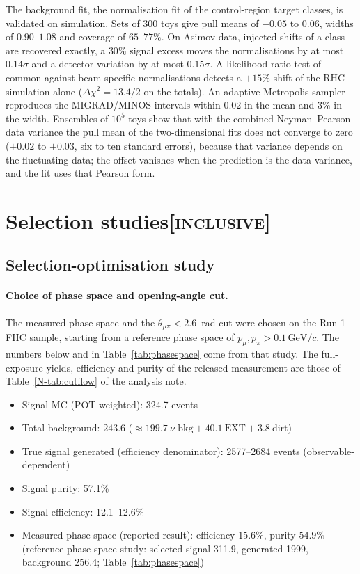 \documentclass[11pt,a4paper]{article}
\newcommand{\GeVc}{\,\text{GeV}\!/c}
\newcommand{\noteref}[2]{#1~\ref{N-#2} of the analysis note}
\newcommand{\scopetag}[1]{\hfill{\normalfont\small\textsc{[#1]}}}
\begin{document}
The background fit, the normalisation fit of the control-region target classes, is validated on
simulation. Sets of $300$ toys give pull means of $-0.05$ to $0.06$, widths of $0.90$--$1.08$ and coverage of
$65$--$77\%$. On Asimov data, injected shifts of a class are recovered exactly, a $30\%$ signal excess
moves the normalisations by at most $0.14\sigma$ and a detector variation by at most $0.15\sigma$. A
likelihood-ratio test of common against beam-specific normalisations detects a $+15\%$ shift of the RHC
simulation alone ($\Delta\chi^2=13.4/2$ on the totals). An adaptive Metropolis sampler reproduces the
MIGRAD/MINOS intervals within $0.02$ in the mean and $3\%$ in the width. Ensembles of $10^5$ toys show
that with the combined Neyman--Pearson data variance the pull mean of the two-dimensional fits does not
converge to zero ($+0.02$ to $+0.03$, six to ten standard errors), because that variance depends on the
fluctuating data; the offset vanishes when the prediction is the data variance, and the fit uses that
Pearson form.



\section[Selection studies]{Selection studies\scopetag{inclusive}}
\label{sec:supp_moved}

\subsection{Selection-optimisation study}
\label{sec:supp_optim}

\paragraph{Choice of phase space and opening-angle cut.} The
measured phase space and the $\theta_{\mu\pi}<2.6$~rad cut were chosen on the Run-1 FHC
sample, starting from a reference phase space of $p_\mu,p_\pi>0.1\GeVc$. The numbers
below and in Table~\ref{tab:phasespace} come from that study. The full-exposure yields,
efficiency and purity of the released measurement are those of
\noteref{Table}{tab:cutflow}.
\begin{itemize}[noitemsep]
  \item Signal MC (POT-weighted): 324.7 events
  \item Total background: $243.6$ ($\approx199.7~\nu\text{-bkg} + 40.1~\mathrm{EXT} + 3.8~\mathrm{dirt}$)
  \item True signal generated (efficiency denominator): 2577--2684 events (observable-dependent)
  \item Signal purity: 57.1\%
  \item Signal efficiency: 12.1--12.6\%
  \item Measured phase space (reported result): efficiency $15.6\%$,
    purity $54.9\%$ (reference phase-space study: selected signal 311.9, generated
    1999, background 256.4; Table~\ref{tab:phasespace})
\end{itemize}
\end{document}
